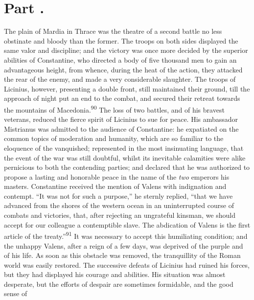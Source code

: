 
\section{Part \thesection.}

The plain of Mardia in Thrace was the theatre of a second battle
no less obstinate and bloody than the former. The troops on both
sides displayed the same valor and discipline; and the victory
was once more decided by the superior abilities of Constantine,
who directed a body of five thousand men to gain an advantageous
height, from whence, during the heat of the action, they attacked
the rear of the enemy, and made a very considerable slaughter.
The troops of Licinius, however, presenting a double front, still
maintained their ground, till the approach of night put an end to
the combat, and secured their retreat towards the mountains of
Macedonia.\textsuperscript{90} The loss of two battles, and of his bravest
veterans, reduced the fierce spirit of Licinius to sue for peace.
His ambassador Mistrianus was admitted to the audience of
Constantine: he expatiated on the common topics of moderation and
humanity, which are so familiar to the eloquence of the
vanquished; represented in the most insinuating language, that
the event of the war was still doubtful, whilst its inevitable
calamities were alike pernicious to both the contending parties;
and declared that he was authorized to propose a lasting and
honorable peace in the name of the \textit{two} emperors his masters.
Constantine received the mention of Valens with indignation and
contempt. “It was not for such a purpose,” he sternly replied,
“that we have advanced from the shores of the western ocean in an
uninterrupted course of combats and victories, that, after
rejecting an ungrateful kinsman, we should accept for our
colleague a contemptible slave. The abdication of Valens is the
first article of the treaty.”\textsuperscript{91} It was necessary to accept this
humiliating condition; and the unhappy Valens, after a reign of a
few days, was deprived of the purple and of his life. As soon as
this obstacle was removed, the tranquillity of the Roman world
was easily restored. The successive defeats of Licinius had
ruined his forces, but they had displayed his courage and
abilities. His situation was almost desperate, but the efforts of
despair are sometimes formidable, and the good sense of
